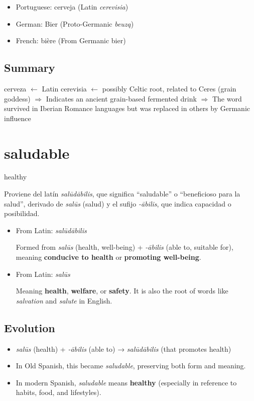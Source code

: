 \documentclass[10pt]{book}
\newcommand{\wordentry}[2]{
	\large #1
	\vspace{-0.5em}
	\begin{etymologybox}
		#2
	\end{etymologybox}
}
\let\oldsection\section
\renewcommand{\section}[1]{
	\needspace{8\baselineskip}
	\oldsection{#1}
}
\begin{document}
	\begin{itemize}
		\item Portuguese: cerveja (Latin \textit{cerevisia})
		
		\item German: Bier (Proto-Germanic \textit{beuzą})
		
		\item French: bière (From Germanic bier)
	\end{itemize}
	
	\subsection{Summary}
	
	cerveza $\leftarrow$ Latin cerevisia $\leftarrow$ possibly Celtic root, related to Ceres (grain goddess)
	$\Rightarrow$ Indicates an ancient grain-based fermented drink
	$\Rightarrow$ The word survived in Iberian Romance languages but was replaced in others by Germanic influence
	
	\section{saludable}
	\wordentry{healthy}{
		Proviene del latín \textit{salūdābilis}, que significa “saludable” o “beneficioso para la salud”, derivado de \textit{salūs} (salud) y el sufijo \textit{-ābilis}, que indica capacidad o posibilidad.
		\begin{itemize}
			\item From Latin: \textit{salūdābilis}
			
			Formed from \textit{salūs} (health, well-being) + \textit{-ābilis} (able to, suitable for), meaning \textbf{conducive to health} or \textbf{promoting well-being}.
			
			\item From Latin: \textit{salūs}
			
			Meaning \textbf{health}, \textbf{welfare}, or \textbf{safety}. It is also the root of words like \textit{salvation} and \textit{salute} in English.
		\end{itemize}
	}
	
	\subsection*{Evolution}
	\begin{itemize}
		\item \textit{salūs} (health) + \textit{-ābilis} (able to) → \textit{salūdābilis} (that promotes health)
		\item In Old Spanish, this became \textit{saludable}, preserving both form and meaning.
		\item In modern Spanish, \textit{saludable} means \textbf{healthy} (especially in reference to habits, food, and lifestyles).
	\end{itemize}
	
\end{document}
